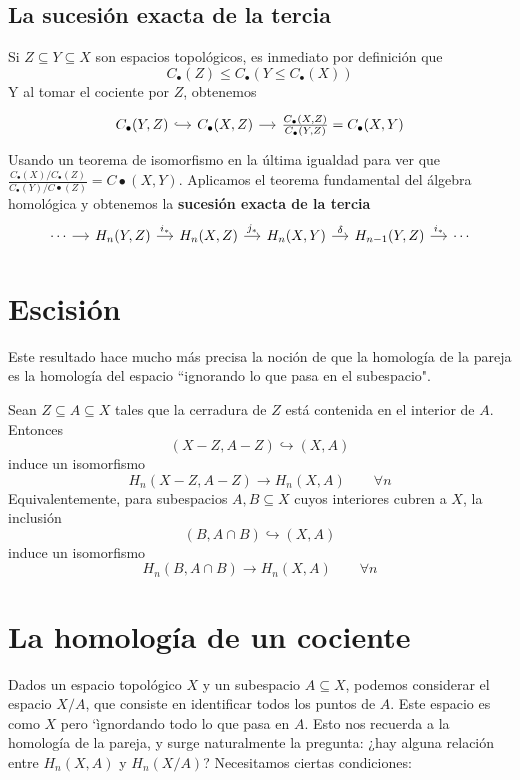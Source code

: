 \documentclass[spanish]{book}
\theoremstyle{definition}
\begin{document}
\subsection{La sucesión exacta de la tercia}
	Si $Z\subseteq Y\subseteq X$ son espacios topológicos, es inmediato por definición que
	\[C_\bullet(Z)\leq C_\bullet(Y\leq C_\bullet(X))\]
	Y al tomar el cociente por $Z$, obtenemos 
	\[\begin{tikzcd}[column sep=small]
		C_\bullet(Y,Z)\arrow[r,hook]&C_\bullet(X,Z)\arrow[r]&\frac{C_\bullet(X,Z)}{C_\bullet(Y,Z)}=C_\bullet(X,Y)
	\end{tikzcd}\]
	Usando un teorema de isomorfismo en la última igualdad para ver que $\frac{C_\bullet(X)/C_\bullet(Z)}{C_\bullet(Y)/C\bullet(Z)}=C\bullet(X,Y)$. Aplicamos el teorema fundamental del álgebra homológica y obtenemos la \textbf{sucesión exacta de la tercia}
	\[\begin{tikzcd}[column sep=small]
		\cdots\arrow[r]&H_n(Y,Z)\arrow[r,"i_*"]&H_n(X,Z)\arrow[r,"j_*"]&H_n(X,Y)\arrow[r,"\delta"]&H_{n-1}(Y,Z)\arrow[r,"i_*"]&\cdots
	\end{tikzcd}\]
\section{Escisión}\label{sec:escisión}
Este resultado hace mucho más precisa la noción de que la homología de la pareja es la homología del espacio ``ignorando lo que pasa en el subespacio".

Sean $Z\subseteq A\subseteq X$ tales que la cerradura de $Z$ está contenida en el interior de $A$. Entonces
\[(X-Z,A-Z)\hookrightarrow (X,A)\]
induce un isomorfismo
\[H_n(X-Z,A-Z)\to H_n(X,A)\qquad\forall n\]
Equivalentemente, para subespacios $A,B\subseteq X$ cuyos interiores cubren a $X$, la inclusión
\[(B,A\cap B)\hookrightarrow (X,A)\]
induce un isomorfismo
\[H_n(B,A\cap B)\to H_n(X,A)\qquad\forall n\]

\section{La homología de un cociente}
	Dados un espacio topológico $X$ y un subespacio $A\subseteq X$, podemos considerar el espacio $X/A$, que consiste en identificar todos los puntos de $A$. Este espacio es como $X$ pero `ìgnordando todo lo que pasa en $A$. Esto nos recuerda a la homología de la pareja, y surge naturalmente la pregunta: ¿hay alguna relación entre $H_n(X,A)$ y $H_n(X/A)$? Necesitamos ciertas condiciones:
	
\end{document}
